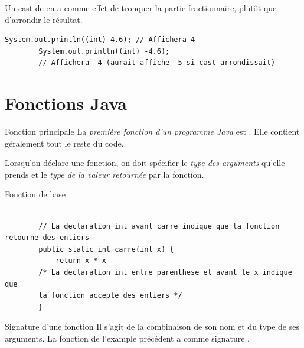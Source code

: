 \documentclass{report}
\begin{document}
\begin{note}
Un cast de  en  a comme effet de tronquer la partie fractionnaire, plutôt que d'arrondir le résultat. 
\end{note}

\begin{EExample*}{}{}
	\begin{lstlisting}[style=JavaDraculaWhite]
		System.out.println((int) 4.6); // Affichera 4
		System.out.println((int) -4.6); 
		// Affichera -4 (aurait affiche -5 si cast arrondissait) 
	\end{lstlisting}
\end{EExample*}

% 
\section{Fonctions Java}
\begin{Concept*}{Fonction principale}
	La \textit{première fonction d'un programme Java} est . Elle contient géralement tout le reste du code. 
\end{Concept*}

\noindent Lorsqu'on déclare une fonction, on doit spécifier le \textit{type des arguments} qu'elle prends et le
\textit{type de la valeur retournée} par la fonction.

\begin{EExample*}{Fonction de base}{}
	\begin{lstlisting}[style=JavaDraculaWhite]
		
		// La declaration int avant carre indique que la fonction retourne des entiers
		public static int carre(int x) {
		    return x * x
		/* La declaration int entre parenthese et avant le x indique que 
		la fonction accepte des entiers */
		}
	\end{lstlisting}
\end{EExample*}

\begin{DefG*}{Signature d'une fonction}{}
	Il s'agit de la combinaison de son nom et du type de ses arguments. La fonction de l'example précédent a
	comme signature .
\end{DefG*}
\end{document}
